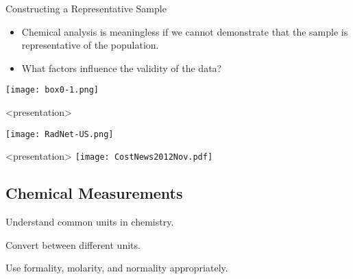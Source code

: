 \documentclass[notes=only]{beamer}
\begin{document}
\begin{frame}{Constructing a Representative Sample}
	\begin{itemize}
		\item Chemical analysis is meaningless if we cannot demonstrate
			that the sample is \alert{representative} of the
			population.
		\item What factors influence the validity of the data?
	\end{itemize}

	\begin{center}
		\texttt{[image: box0-1.png]}
	\end{center}
\end{frame}

\begin{frame}<presentation>
	\begin{center}
		\texttt{[image: RadNet-US.png]}
	\end{center}
	\let\thefootnote\relax{}
\end{frame}

\begin{frame}<presentation>
	\centering
	\texttt{[image: CostNews2012Nov.pdf]}
\end{frame}


\begin{frame}
	\section{Chemical Measurements}
	\begin{learningobjectives}
		\item Understand common units in chemistry.
		\item Convert between different units.
		\item Use formality, molarity, and normality appropriately.
	\end{learningobjectives}
\end{frame}
\end{document}
